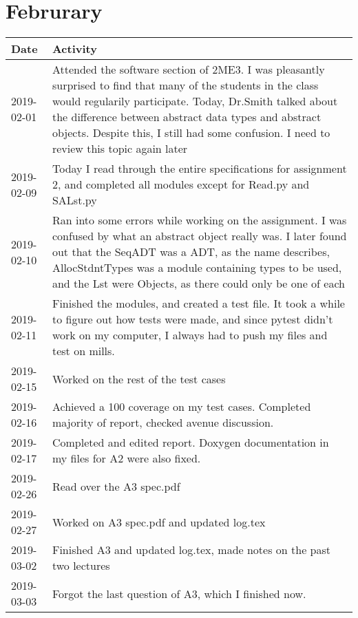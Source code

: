 \documentclass[12pt]{article}
\begin{document}
\section{Februrary}


 \begin{tabular}{|p{2cm}| p{12cm}|} 
 \hline
 Date & Activity  \\ 
 \hline
   2019-02-01 & Attended the software section of 2ME3. I was pleasantly surprised to find that many of the students in the class would regularily participate. Today, Dr.Smith talked about the difference between abstract data types and abstract objects. Despite this, I still had some confusion. I need to review this topic again later \\
 \hline
   2019-02-09 & Today I read through the entire specifications for assignment 2, and completed all modules except for Read.py and SALst.py \\
 \hline
    2019-02-10 & Ran into some errors while working on the assignment. I was confused by what an abstract object really was. I later found out that the SeqADT was a ADT, as the name describes, AllocStdntTypes was a module containing types to be used, and the Lst were Objects, as there could only be one of each \\
 \hline
   2019-02-11 & Finished the modules, and created a test file. It took a while to figure out how tests were made, and since pytest didn't work on my computer, I always had to push my files and test on mills. \\
 \hline
    2019-02-15 & Worked on the rest of the test cases \\
 \hline
    2019-02-16 & Achieved a 100 coverage on my test cases. Completed majority of report, checked avenue discussion.\\
 \hline
     2019-02-17 & Completed and edited report. Doxygen documentation in my files for A2 were also fixed. \\
 \hline
      2019-02-26 & Read over the A3 spec.pdf  \\
 \hline
       2019-02-27 & Worked on A3 spec.pdf and updated log.tex  \\
 \hline
        2019-03-02 & Finished A3 and updated log.tex, made notes on the past two lectures \\
 \hline
         2019-03-03 & Forgot the last question of A3, which I finished now. \\
 \hline
 	
\end{tabular}
\end{document}
